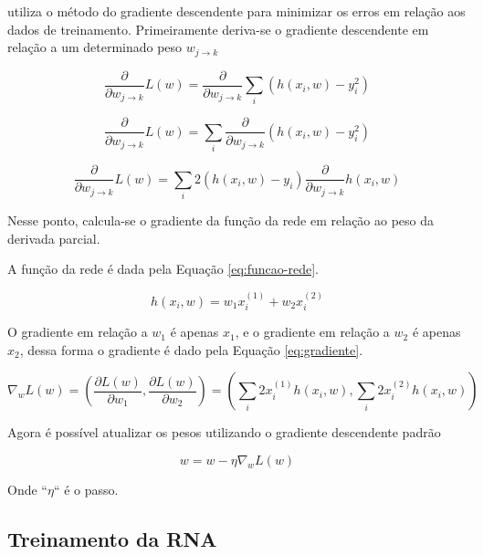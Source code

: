  utiliza o método do gradiente descendente para minimizar os erros em relação aos dados de treinamento. Primeiramente deriva-se o gradiente descendente em relação a um determinado peso $w_{j \rightarrow k}$

\begin{equation}
    \frac{\partial}{\partial w_{j \rightarrow k}}L(w) = \frac{\partial}{\partial w_{j \rightarrow k}} \sum_i \left( h(x_i,w)-y_i^2 \right)
\end{equation}

\begin{equation}
    \frac{\partial}{\partial w_{j \rightarrow k}}L(w) = \sum_i \frac{\partial}{\partial w_{j \rightarrow k}} \left( h(x_i,w)-y_i^2 \right)
\end{equation}

\begin{equation}
    \frac{\partial}{\partial w_{j \rightarrow k}}L(w) = \sum_i 2(h(x_i,w)-y_i) \frac{\partial}{\partial w_{j \rightarrow k}} h(x_i,w)
\end{equation}

Nesse ponto, calcula-se o gradiente da função da rede em relação ao peso da derivada parcial. 

A função da rede é dada pela Equação \ref{eq:funcao-rede}.

\begin{equation}
\label{eq:funcao-rede}
    h(x_i,w) = w_1x_i^{(1)} + w_2x_i^{(2)}
\end{equation}

O gradiente em relação a $w_1$ é apenas $x_1$, e o gradiente em relação a $w_2$ é apenas $x_2$, dessa forma o gradiente é dado pela Equação \ref{eq:gradiente}.

\begin{equation}
\label{eq:gradiente}
    \nabla_wL(w) = \left( \frac{\partial L(w)}{\partial w_1}, \frac{\partial L(w)}{\partial w_2} \right) = \left( \sum_i 2x_i ^{(1)} h(x_i,w), \sum_i 2x_i ^{(2)} h(x_i,w) \right)
\end{equation}

Agora é possível atualizar os pesos utilizando o gradiente descendente padrão

\begin{equation}
    w = w -\eta \nabla_w L(w)
\end{equation}

Onde ``$\eta$`` é o passo.

\subsection{Treinamento da RNA}

